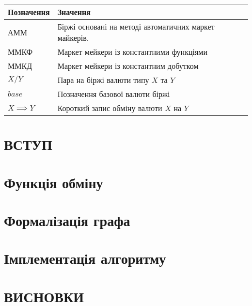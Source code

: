 \documentclass[14pt]{extarticle}
\begin{document}
\begin{center}
	\begin{tabular}{ll}
		Позначення       & Значення                                               \\[0pt]
		\hline{}
		АММ              & Біржі основані на методі автоматичних маркет майкерів. \\[0pt]
		ММКФ             & Маркет мейкери із константними функціями               \\[0pt]
		ММКД             & Маркет мейкери із константним добутком                 \\[0pt]
		\(X/Y\)          & Пара на біржі валюти типу \(X\) та \(Y\)               \\[0pt]
		$base$           & Позначення базової валюти біржі                        \\[0pt]
		\(X \implies Y\) & Короткий запис обміну валюти \(X\) на \(Y\)            \\[0pt]
	\end{tabular}
\end{center}

\newpage

\section{ВСТУП}\label{sec:intro}


\newpage

\section{Функція обміну}\label{sec:swap-function}


\newpage

\section{Формалізація графа}\label{sec:graph}


\newpage

\section{Імплементація алгоритму}\label{sec:algorithm-impl}


\newpage

\section{ВИСНОВКИ}
\end{document}
